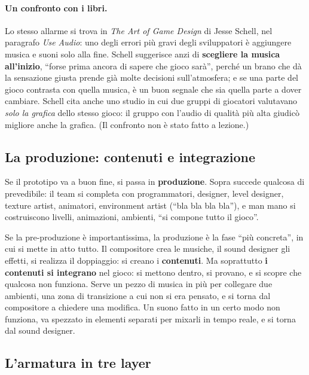 \paragraph{Un confronto con i libri.} Lo stesso allarme si trova in \emph{The
Art of Game Design} di Jesse Schell, nel paragrafo \emph{Use Audio}: uno degli
errori più gravi degli sviluppatori è aggiungere musica e suoni solo alla fine.
Schell suggerisce anzi di \textbf{scegliere la musica all'inizio}, ``forse
prima ancora di sapere che gioco sarà'', perché un brano che dà la sensazione
giusta prende già molte decisioni sull'atmosfera; e se una parte del gioco
contrasta con quella musica, è un buon segnale che sia quella parte a dover
cambiare. Schell cita anche uno studio in cui due gruppi di giocatori valutavano
\emph{solo la grafica} dello stesso gioco: il gruppo con l'audio di qualità più
alta giudicò migliore anche la grafica. (Il confronto non è stato fatto a
lezione.)

\subsection{La produzione: contenuti e integrazione}

Se il prototipo va a buon fine, si passa in \textbf{produzione}. Sopra succede
qualcosa di prevedibile: il team si completa con programmatori, designer, level
designer, texture artist, animatori, environment artist (``bla bla bla bla''), e
man mano si costruiscono livelli, animazioni, ambienti, ``si compone tutto il
gioco''.

Se la pre-produzione è importantissima, la produzione è la fase ``più concreta'',
in cui si mette in atto tutto. Il compositore crea le musiche, il sound designer
gli effetti, si realizza il doppiaggio: si creano i \textbf{contenuti}. Ma
soprattutto \textbf{i contenuti si integrano} nel gioco: si mettono dentro, si
provano, e si scopre che qualcosa non funziona. Serve un pezzo di musica in più
per collegare due ambienti, una zona di transizione a cui non si era pensato, e
si torna dal compositore a chiedere una modifica. Un suono fatto in un certo modo
non funziona, va spezzato in elementi separati per mixarli in tempo reale, e si
torna dal sound designer.

\subsection{L'armatura in tre layer}

